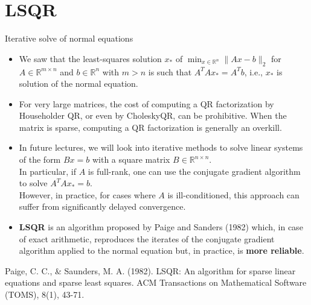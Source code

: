 \documentclass[t,usepdftitle=false]{beamer}
\begin{document}
\section{LSQR}
\begin{frame}{Iterative solve of normal equations}
\begin{itemize}
\item We saw that the least-squares solution $x_*$ of $\min_{x\in\mathbb{R}^n}\|Ax-b\|_2$ for $A\in\mathbb{R}^{m\times n}$ and $b\in\mathbb{R}^n$ with $m>n$ is such that $A^TAx_*=A^Tb$, i.e., $x_*$ is solution of the normal equation. 
\item For very large matrices, the cost of computing a QR factorization by Householder QR, or even by CholeskyQR, can be prohibitive.
When the matrix is sparse, computing a QR factorization is generally an overkill.
\item In future lectures, we will look into iterative methods to solve linear systems of the form $Bx=b$ with a square matrix $B\in\mathbb{R}^{n\times n}$.\vspace{.1cm}\\
In particular, if $A$ is full-rank, one can use the conjugate gradient algorithm to solve $A^TAx_*=b$.\vspace{.1cm}\\
However, in practice, for cases where $A$ is ill-conditioned, this approach can suffer from significantly delayed convergence.
\item \textbf{LSQR} is an algorithm proposed by Paige and Sanders (1982) which, in case of exact arithmetic, reproduces the iterates of the conjugate gradient algorithm applied to the normal equation but, in practice, is \textbf{more reliable}.
\end{itemize}
\medskip
\tiny{Paige, C. C., \& Saunders, M. A. (1982). LSQR: An algorithm for sparse linear equations and sparse least squares. ACM Transactions on Mathematical Software (TOMS), 8(1), 43-71.}
\end{frame}
\end{document}
